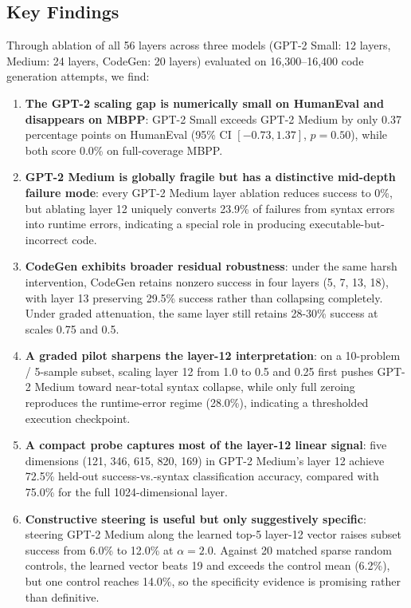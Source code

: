\documentclass[preprint,12pt,authoryear]{elsarticle}
\begin{document}
\subsection{Key Findings}

Through ablation of all 56 layers across three models (GPT-2 Small: 12 layers, Medium: 24 layers, CodeGen: 20 layers) evaluated on 16{,}300--16{,}400 code generation attempts, we find:

\begin{enumerate}
\item \textbf{The GPT-2 scaling gap is numerically small on HumanEval and disappears on MBPP}: GPT-2 Small exceeds GPT-2 Medium by only 0.37 percentage points on HumanEval (95\% CI $[-0.73, 1.37]$, $p=0.50$), while both score 0.0\% on full-coverage MBPP.

\item \textbf{GPT-2 Medium is globally fragile but has a distinctive mid-depth failure mode}: every GPT-2 Medium layer ablation reduces success to 0\%, but ablating layer 12 uniquely converts 23.9\% of failures from syntax errors into runtime errors, indicating a special role in producing executable-but-incorrect code.

\item \textbf{CodeGen exhibits broader residual robustness}: under the same harsh intervention, CodeGen retains nonzero success in four layers (5, 7, 13, 18), with layer 13 preserving 29.5\% success rather than collapsing completely. Under graded attenuation, the same layer still retains 28-30\% success at scales 0.75 and 0.5.

\item \textbf{A graded pilot sharpens the layer-12 interpretation}: on a 10-problem / 5-sample subset, scaling layer 12 from 1.0 to 0.5 and 0.25 first pushes GPT-2 Medium toward near-total syntax collapse, while only full zeroing reproduces the runtime-error regime (28.0\%), indicating a thresholded execution checkpoint.

\item \textbf{A compact probe captures most of the layer-12 linear signal}: five dimensions (121, 346, 615, 820, 169) in GPT-2 Medium's layer 12 achieve 72.5\% held-out success-vs.-syntax classification accuracy, compared with 75.0\% for the full 1024-dimensional layer.

\item \textbf{Constructive steering is useful but only suggestively specific}: steering GPT-2 Medium along the learned top-5 layer-12 vector raises subset success from 6.0\% to 12.0\% at $\alpha=2.0$. Against 20 matched sparse random controls, the learned vector beats 19 and exceeds the control mean (6.2\%), but one control reaches 14.0\%, so the specificity evidence is promising rather than definitive.


\end{enumerate}
\end{document}
